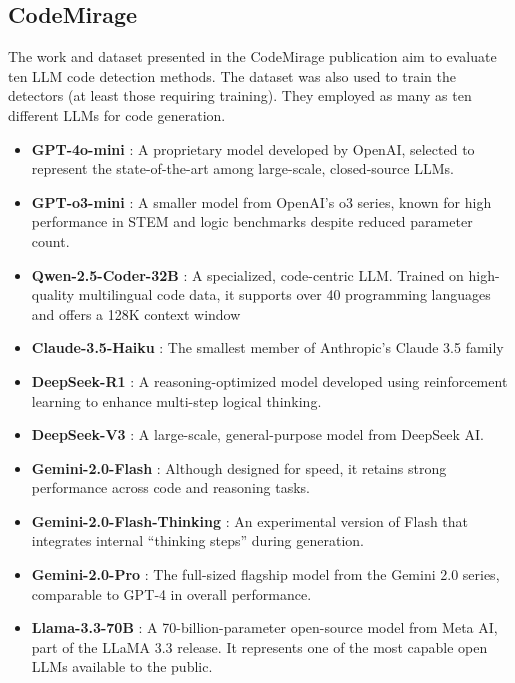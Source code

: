 \subsection{CodeMirage}
\label{section:CodeMirage}
The work and dataset presented in the CodeMirage 
publication aim to evaluate ten LLM code detection 
methods. The dataset was also used to train the detectors 
(at least those requiring training).
They employed as many as ten different LLMs for 
code generation.

\begin{itemize}
    \item \textbf{GPT-4o-mini} \cite{openai_gpt4o_2024} : A proprietary model developed by OpenAI, selected to represent the state-of-the-art among large-scale, closed-source LLMs.
    \item \textbf{GPT-o3-mini} \cite{o3mini-openai-2025} : A smaller model from OpenAI's o3 series, known for high performance in STEM and logic benchmarks despite reduced parameter count.
    \item \textbf{Qwen-2.5-Coder-32B} \cite{hui2024qwen2} :  A specialized, code-centric LLM. Trained on high-quality multilingual code data, it supports over 40 programming languages and offers a 128K context window
    \item \textbf{Claude-3.5-Haiku} \cite{anthropic2024model} : The smallest member of Anthropic’s Claude 3.5 family
    \item \textbf{DeepSeek-R1} \cite{guo2025deepseek} : A reasoning-optimized model developed using reinforcement learning to enhance multi-step logical thinking.
    \item \textbf{DeepSeek-V3} \cite{liu2024deepseek} : A large-scale, general-purpose model from DeepSeek AI.
    \item \textbf{Gemini-2.0-Flash} \cite{google-gemini2-flash-2025} : Although designed for speed, it retains strong performance across code and reasoning tasks.
    \item \textbf{Gemini-2.0-Flash-Thinking} \cite{google-gemini2-flash-2025} : An experimental version of Flash that integrates internal “thinking steps” during generation. 
    \item \textbf{Gemini-2.0-Pro} \cite{google-gemini2-flash-2025} : The full-sized flagship model from the Gemini 2.0 series, comparable to GPT‑4 in overall performance.
    \item \textbf{Llama-3.3-70B} \cite{grattafiori2024llama} : A 70-billion-parameter open-source model from Meta AI, part of the LLaMA 3.3 release. It represents one of the most capable open LLMs available to the public.

\end{itemize}







